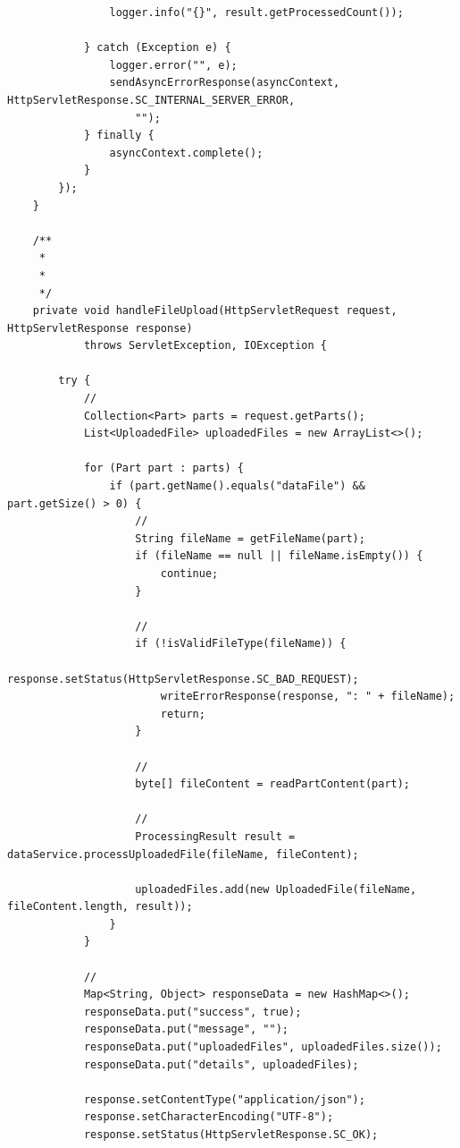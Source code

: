 \begin{verbatim}
                logger.info("{}", result.getProcessedCount());
                
            } catch (Exception e) {
                logger.error("", e);
                sendAsyncErrorResponse(asyncContext, HttpServletResponse.SC_INTERNAL_SERVER_ERROR, 
                    "");
            } finally {
                asyncContext.complete();
            }
        });
    }
    
    /**
     * 
     * 
     */
    private void handleFileUpload(HttpServletRequest request, HttpServletResponse response) 
            throws ServletException, IOException {
        
        try {
            // 
            Collection<Part> parts = request.getParts();
            List<UploadedFile> uploadedFiles = new ArrayList<>();
            
            for (Part part : parts) {
                if (part.getName().equals("dataFile") && part.getSize() > 0) {
                    // 
                    String fileName = getFileName(part);
                    if (fileName == null || fileName.isEmpty()) {
                        continue;
                    }
                    
                    // 
                    if (!isValidFileType(fileName)) {
                        response.setStatus(HttpServletResponse.SC_BAD_REQUEST);
                        writeErrorResponse(response, ": " + fileName);
                        return;
                    }
                    
                    // 
                    byte[] fileContent = readPartContent(part);
                    
                    // 
                    ProcessingResult result = dataService.processUploadedFile(fileName, fileContent);
                    
                    uploadedFiles.add(new UploadedFile(fileName, fileContent.length, result));
                }
            }
            
            // 
            Map<String, Object> responseData = new HashMap<>();
            responseData.put("success", true);
            responseData.put("message", "");
            responseData.put("uploadedFiles", uploadedFiles.size());
            responseData.put("details", uploadedFiles);
            
            response.setContentType("application/json");
            response.setCharacterEncoding("UTF-8");
            response.setStatus(HttpServletResponse.SC_OK);
            

\end{verbatim}
